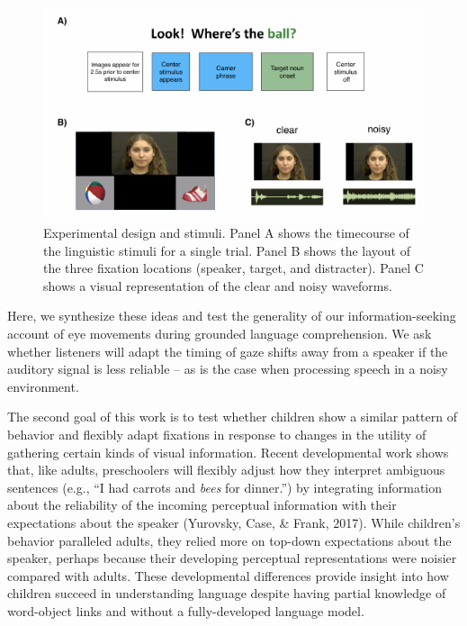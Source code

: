 \documentclass[10pt, letterpaper]{article}
\newenvironment{CodeChunk}{}{}
\begin{document}
\begin{CodeChunk}
\begin{figure}[tb]

{\centering \includegraphics[width=0.8\linewidth]{figs/stimuli_plot-1} 

}

\caption[Experimental design and stimuli]{Experimental design and stimuli. Panel A shows the timecourse of the linguistic stimuli for a single trial. Panel B shows the layout of the three fixation locations (speaker, target, and distracter). Panel C shows a visual representation of the clear and noisy waveforms.}\label{fig:stimuli_plot}
\end{figure}
\end{CodeChunk}

Here, we synthesize these ideas and test the generality of our
information-seeking account of eye movements during grounded language
comprehension. We ask whether listeners will adapt the timing of gaze
shifts away from a speaker if the auditory signal is less reliable -- as
is the case when processing speech in a noisy environment.

The second goal of this work is to test whether children show a similar
pattern of behavior and flexibly adapt fixations in response to changes
in the utility of gathering certain kinds of visual information. Recent
developmental work shows that, like adults, preschoolers will flexibly
adjust how they interpret ambiguous sentences (e.g., ``I had carrots and
\emph{bees} for dinner.'') by integrating information about the
reliability of the incoming perceptual information with their
expectations about the speaker (Yurovsky, Case, \& Frank, 2017). While
children's behavior paralleled adults, they relied more on top-down
expectations about the speaker, perhaps because their developing
perceptual representations were noisier compared with adults. These
developmental differences provide insight into how children succeed in
understanding language despite having partial knowledge of word-object
links and without a fully-developed language model.
\end{document}

